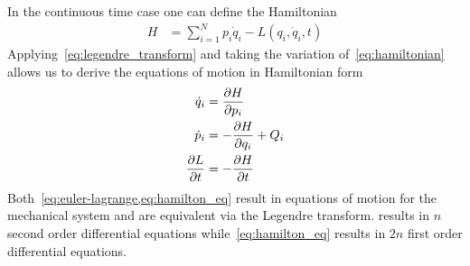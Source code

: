 \documentclass[letterpaper, preprint, paper,11pt]{AAS}	%
\begin{document}
In the continuous time case one can define the Hamiltonian
\begin{align}\label{eq:hamiltonian}
	H &= \sum_{i = 1}^N p_i \dot{q}_i - L \left( q_i,\dot{q}_i, t \right)
\end{align}
Applying~\cref{eq:legendre_transform} and taking the variation of~\cref{eq:hamiltonian} allows us to derive the equations of motion in Hamiltonian form
\begin{align}\label{eq:hamilton_eq}
	\dot{q}_i &= \deriv{H}{p_i} \\
	\dot{p}_i &= - \deriv{H}{q_i} + Q_i \\
	\deriv{L}{t} &= -\deriv{H}{t}
\end{align}
Both~\cref{eq:euler-lagrange,eq:hamilton_eq} result in equations of motion for the mechanical system and are equivalent via the Legendre transform.
 results in \( n \) second order differential equations while~\cref{eq:hamilton_eq} results in \( 2n \) first order differential equations.
\end{document}
